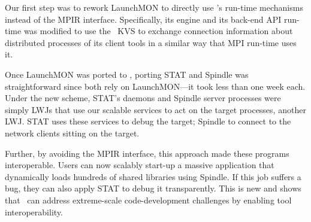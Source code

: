 Our first step was to rework LaunchMON
to directly use \flux's run-time mechanisms instead 
of the MPIR interface. Specifically, its engine
and its back-end API run-time
was modified to use the \flux\ KVS
to exchange connection information about 
distributed processes of its client tools in a similar way that MPI run-time 
uses it. 

Once LaunchMON was ported to \flux, porting
STAT and {\sc Spindle} was
straightforward since both rely on LaunchMON---it took less than one week each.
Under the new scheme, STAT's daemons 
and {\sc Spindle} server processes were simply LWJs 
that use our scalable services to act on the target processes, 
another LWJ. STAT uses these services to debug the 
target; {\sc Spindle} to connect to the network clients sitting on the target.

Further, by avoiding the MPIR interface, 
this approach made these programs interoperable.
Users can now scalably start-up a massive application 
that dynamically loads hundreds of shared libraries 
using {\sc Spindle}.
If this job suffers a bug, they can also apply
STAT to debug it transparently.
This is new and shows that \flux\ can address extreme-scale 
code-development challenges by enabling tool interoperability.
